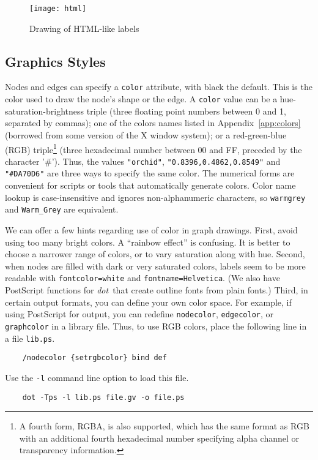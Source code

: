 \documentclass[11pt]{article}
\def\dot{{\it dot}}
\begin{document}
{\begin{figure}[p]
	\centerline {
		\texttt{[image: html]}
	}
    \caption{Drawing of HTML-like labels}
    \label{fig:html}
\end{figure}

\subsection{Graphics Styles}
\label{sect:style}

Nodes and edges can specify a {\tt color} attribute, with black
the default. This is the color used to draw the node's shape
or the edge. A {\tt color} value can be a hue-saturation-brightness triple
(three floating point numbers between 0 and 1, separated by commas);
one of the colors names listed in Appendix~\ref{app:colors}
(borrowed from some version of the X window system); or
a red-green-blue (RGB) triple\footnote{A fourth form, RGBA, is also supported,
which has the same format as RGB with an additional fourth hexadecimal 
number specifying alpha channel or transparency information.}
(three hexadecimal number between 00 and FF, preceded by the character '\#').
Thus, the values {\tt "orchid"}, {\tt "0.8396,0.4862,0.8549"} and
{\tt "\#DA70D6"} are three ways to specify the same color.
The numerical forms are convenient for scripts or tools that
automatically generate colors.
Color name lookup is case-insensitive and ignores non-alphanumeric
characters, so \verb'warmgrey' and \verb'Warm_Grey' are equivalent.

We can offer a few hints regarding use of color in graph drawings.
First, avoid using too many bright colors.
A ``rainbow effect'' is confusing.
It is better to choose a narrower range of colors, or
to vary saturation along with hue.
Second, when nodes are filled with dark or very saturated
colors, labels seem to be more readable with \verb"fontcolor=white"
and \verb"fontname=Helvetica".  (We also have PostScript functions
for \dot\ that create outline fonts from plain fonts.)
Third, in certain output formats, you can define your own color space.
For example, if using PostScript for output, you can redefine
\verb"nodecolor", \verb"edgecolor", or \verb"graphcolor"
in a library file.  Thus, to use RGB colors, place
the following line in a file \verb"lib.ps".
\begin{verbatim}
    /nodecolor {setrgbcolor} bind def
\end{verbatim}
Use the \verb"-l" command line option to load this file.
\begin{verbatim}
    dot -Tps -l lib.ps file.gv -o file.ps
\end{verbatim}

}
\end{document}
